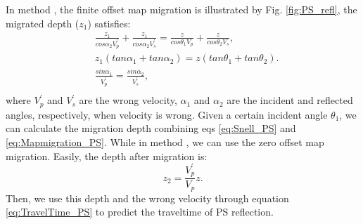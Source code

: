 \documentclass[extra,mreferee]{gji}
\newcommand{\Rome}[1]{{\bf\uppercase\expandafter{\romannumeral #1\relax}}}
\begin{document}
In method \Rome{1}, the finite offset map migration is illustrated by Fig.
\ref{fig:PS_refl}, the migrated depth ($z_{1}$) satisfies:
\begin{equation}
	\begin{split}
	&\frac{z_{1}}{cos\alpha_2V^{'}_p}+\frac{z_{1}}{cos\alpha_2V^{'}_s}=\frac{z}{cos\theta_1V_p}+\frac{z}{cos\theta_2V_s},\\
	&z_{1}(tan\alpha_1+tan\alpha_2)=z(tan\theta_1+tan\theta_2).\\
	&\frac{sin\alpha_1}{V^{'}_p}=\frac{sin\alpha_2}{V^{'}_s},\\
	\end{split}
	\label{eq:Mapmigration_PS} 
\end{equation}
where $V^{'}_p$ and $V^{'}_s$ are the wrong velocity, $\alpha_1$ and $\alpha_2$ are
the incident and reflected angles, respectively, when velocity is wrong. Given a
certain incident angle $\theta_1$, we can calculate the migration depth combining eqs
\eqref{eq:Snell_PS} and \eqref{eq:Mapmigration_PS}.
While in method \Rome{2}, we can use the zero offset map migration. Easily, the depth after migration is: 
\begin{equation}
	{z_{2}}=\frac{V^{'}_p}{V_p}z.
    \label{eq:ZerooffMig_PP} 
\end{equation}
Then, we use this depth and the
wrong velocity through equation \eqref{eq:TravelTime_PS} to predict the traveltime of PS reflection.
\end{document}

